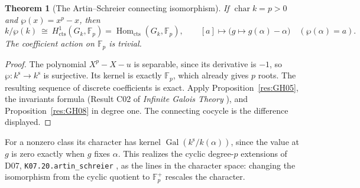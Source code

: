 \documentclass[11pt,oneside,openany]{book}
\newtheorem{theorem}{Theorem}[chapter]
\theoremstyle{definition}
\theoremstyle{remark}
\begin{document}
\begin{theorem}[The Artin--Schreier connecting isomorphism]
\label{res:GH09}
If \(\operatorname{char}k=p>0\) and \(\wp(x)=x^p-x\), then
\[
 k/\wp(k)
   \ \cong\ H^1_{\mathrm{cts}}(G_k,\mathbb F_p)
   =\operatorname{Hom}_{\mathrm{cts}}(G_k,\mathbb F_p),
 \qquad
 [a]\longmapsto \bigl(g\mapsto g(\alpha)-\alpha\bigr)
 \quad(\wp(\alpha)=a).
\]
The coefficient action on \(\mathbb F_p\) is trivial.
\end{theorem}
\begin{proof}
The polynomial \(X^p-X-u\) is separable, since its derivative is
\(-1\), so \(\wp:k^{\mathrm s}\to k^{\mathrm s}\) is surjective.
Its kernel is exactly \(\mathbb F_p\), which already gives \(p\)
roots. The resulting sequence of discrete coefficients is exact.
Apply Proposition~\ref{res:GH05}, the invariants formula
(Result C02 of \emph{Infinite Galois Theory}
\cite[PDF p.~12]{mg-aft}), and Proposition~\ref{res:GH08} in
degree one. The connecting cocycle is the difference displayed.
\end{proof}

For a nonzero class its character has kernel
\(\operatorname{Gal}(k^{\mathrm s}/k(\alpha))\), since the value at
\(g\) is zero exactly when \(g\) fixes \(\alpha\). This realizes
the cyclic degree-\(p\) extensions of D07,
\texttt{K07.20.artin\_schreier} \cite[PDF p.~172]{mg-d07},
as the lines in the character space: changing the isomorphism from
the cyclic quotient to \(\mathbb F_p^+\) rescales the character.
\end{document}
